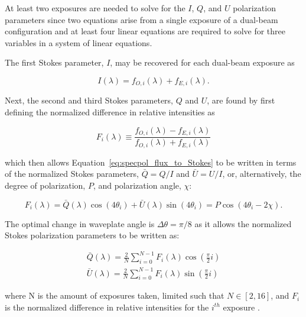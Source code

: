 At least two exposures are needed to solve for the $I$, $Q$, and $U$ polarization parameters since two equations arise from a single exposure of a dual-beam configuration and at least four linear equations are required to solve for three variables in a system of linear equations.
\prgph

The first Stokes parameter, $I$, may be recovered for each dual-beam exposure as

\begin{equation}
  I(\lambda) = f_{O, i}(\lambda) + f_{E, i}(\lambda).
  \label{eq:specpol_I_calc}
\end{equation}

Next, the second and third Stokes parameters, $Q$ and $U$, are found by first defining the normalized difference in relative intensities as

\begin{equation}
  F_{i}(\lambda) \equiv \frac{f_{O, i}(\lambda) - f_{E, i}(\lambda)}{f_{O, i}(\lambda) + f_{E, i}(\lambda)}
  \label{eq:specpol_norm_flux}
\end{equation}

\noindent which then allows Equation~\ref{eq:specpol_flux_to_Stokes} to be written in terms of the normalized Stokes para\-meters, $\bar{Q} = Q / I$ and $\bar{U} = U / I$, or, alternatively, the degree of polarization, $P$, and polarization angle, $\chi$:

\begin{equation}
  F_{i}(\lambda) = \bar{Q}(\lambda) \cos(4\theta_{i}) + \bar{U}(\lambda) \sin(4\theta_{i}) = P\cos(4\theta_{i} - 2\chi).
  \label{eq:specpol_F_to_params}
\end{equation}

The optimal change in waveplate angle is $\Delta\theta = \pi/8$ as it allows the normalized Stokes polarization parameters to be written as:

\begin{equation}
  \begin{gathered}
    \bar{Q}(\lambda) = \frac{2}{N} \sum_{i = 0}^{N - 1} F_{i}(\lambda) \cos(\frac{\pi}{2} i) \\
    \bar{U}(\lambda) = \frac{2}{N} \sum_{i = 0}^{N - 1} F_{i}(\lambda) \sin(\frac{\pi}{2} i)
  \end{gathered}
  \label{eq:specpol_Stokes_sol}
\end{equation}

\noindent where N is the amount of exposures taken, limited such that $N \in [2, 16]$, and $F_{i}$ is the normalized difference in relative intensities for the $i^{th}$ exposure \citep{polarimetry_error}.
\prgph

